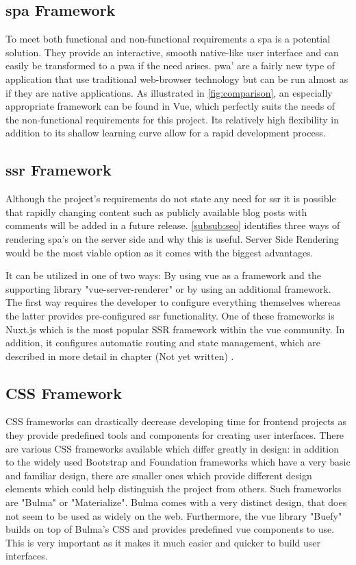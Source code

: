 \subsection{\acrshort{spa} Framework}
To meet both functional and non-functional requirements a \acrfull{spa} is a potential solution. They provide an interactive, smooth native-like user interface and can easily be transformed to a \acrfull{pwa} if the need arises. \acrshort{pwa}' are a fairly new type of application that use traditional web-browser technology but can be run almost as if they are native applications. As illustrated in \autoref{fig:comparison}, an especially appropriate framework can be found in Vue, which perfectly suits the needs of the non-functional requirements for this project. Its relatively high flexibility in addition to its shallow learning curve allow for a rapid development process.

\subsection{\acrshort{ssr} Framework}
Although the project's requirements do not state any need for \acrfull{ssr} it is possible that rapidly changing content such as publicly available blog posts with comments will be added in a future release. \autoref{subsub:seo} identifies three ways of rendering \acrshort{spa}'s on the server side and why this is useful. Server Side Rendering would be the most viable option as it comes with the biggest advantages. 

It can be utilized in one of two ways: By using vue as a framework and the supporting library "vue-server-renderer" or by using an additional framework. The first way requires the developer to configure everything themselves whereas the latter provides pre-configured \acrshort{ssr} functionality. One of these frameworks is Nuxt.js which is the most  popular SSR framework within the vue community. In addition, it configures automatic routing and state management, which are described in more detail in chapter (Not yet written) . 

\subsection{CSS Framework}
CSS frameworks can drastically decrease developing time for frontend projects as they provide predefined tools and components for creating user interfaces. There are various CSS frameworks available which differ greatly in design: in addition to the widely used Bootstrap and Foundation frameworks which have a very basic and familiar design, there are smaller ones which provide different design elements which could help distinguish the project from others. Such frameworks are "Bulma" or "Materialize". Bulma comes with a very distinct design, that does not seem to be used as widely on the web. Furthermore, the vue library "Buefy" builds on top of Bulma's CSS and provides predefined vue components to use. This is very important as it makes it much easier and quicker to build user interfaces.

